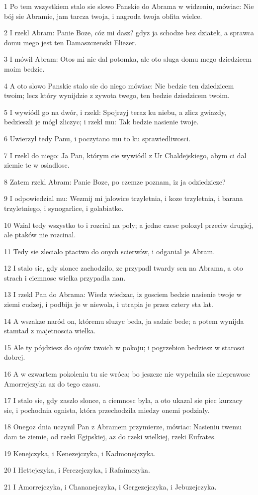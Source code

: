 \par 1 Po tem wszystkiem stalo sie slowo Panskie do Abrama w widzeniu, mówiac: Nie bój sie Abramie, jam tarcza twoja, i nagroda twoja obfita wielce.
\par 2 I rzekl Abram: Panie Boze, cóz mi dasz? gdyz ja schodze bez dziatek, a sprawca domu mego jest ten Damaszczenski Eliezer.
\par 3 I mówil Abram: Otos mi nie dal potomka, ale oto sluga domu mego dziedzicem moim bedzie.
\par 4 A oto slowo Panskie stalo sie do niego mówiac: Nie bedzie ten dziedzicem twoim; lecz który wynijdzie z zywota twego, ten bedzie dziedzicem twoim.
\par 5 I wywiódl go na dwór, i rzekl: Spojrzyj teraz ku niebu, a zlicz gwiazdy, bedzieszli je mógl zliczyc; i rzekl mu: Tak bedzie nasienie twoje.
\par 6 Uwierzyl tedy Panu, i poczytano mu to ku sprawiedliwosci.
\par 7 I rzekl do niego: Ja Pan, którym cie wywiódl z Ur Chaldejskiego, abym ci dal ziemie te w osiadlosc.
\par 8 Zatem rzekl Abram: Panie Boze, po czemze poznam, iz ja odziedzicze?
\par 9 I odpowiedzial mu: Wezmij mi jalowice trzyletnia, i koze trzyletnia, i barana trzyletniego, i synogarlice, i golabiatko.
\par 10 Wzial tedy wszystko to i rozcial na poly; a jedne czesc polozyl przeciw drugiej, ale ptaków nie rozcinal.
\par 11 Tedy sie zlecialo ptactwo do onych scierwów, i odganial je Abram.
\par 12 I stalo sie, gdy slonce zachodzilo, ze przypadl twardy sen na Abrama, a oto strach i ciemnosc wielka przypadla nan.
\par 13 I rzekl Pan do Abrama: Wiedz wiedzac, iz gosciem bedzie nasienie twoje w ziemi cudzej, i podbija je w niewola, i utrapia je przez cztery sta lat.
\par 14 A wszakze naród on, któremu sluzyc beda, ja sadzic bede; a potem wynijda stamtad z majetnoscia wielka.
\par 15 Ale ty pójdziesz do ojców twoich w pokoju; i pogrzebion bedziesz w starosci dobrej.
\par 16 A w czwartem pokoleniu tu sie wróca; bo jeszcze nie wypelnila sie nieprawosc Amorrejczyka az do tego czasu.
\par 17 I stalo sie, gdy zaszlo slonce, a ciemnosc byla, a oto ukazal sie piec kurzacy sie, i pochodnia ognista, która przechodzila miedzy onemi podzialy.
\par 18 Onegoz dnia uczynil Pan z Abramem przymierze, mówiac: Nasieniu twemu dam te ziemie, od rzeki Egipskiej, az do rzeki wielkiej, rzeki Eufrates.
\par 19 Kenejczyka, i Kenezejczyka, i Kadmonejczyka.
\par 20 I Hettejczyka, i Ferezejczyka, i Rafaimczyka.
\par 21 I Amorrejczyka, i Chananejczyka, i Gergezejczyka, i Jebuzejczyka.

